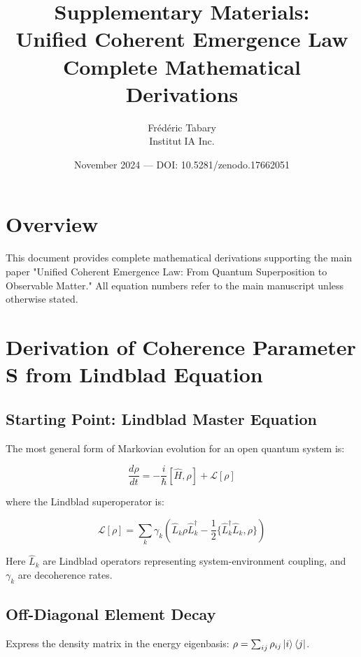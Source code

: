 \documentclass[12pt,a4paper]{article}
\title{\textbf{Supplementary Materials:}\\
\textbf{Unified Coherent Emergence Law}\\
\large Complete Mathematical Derivations}
\author{Frédéric Tabary \\ Institut🦋IA Inc.}
\date{November 2024 --- DOI: 10.5281/zenodo.17662051}
\begin{document}
\maketitle

\section*{Overview}

This document provides complete mathematical derivations supporting the main paper "Unified Coherent Emergence Law: From Quantum Superposition to Observable Matter." All equation numbers refer to the main manuscript unless otherwise stated.

\tableofcontents
\clearpage

\section{Derivation of Coherence Parameter S from Lindblad Equation}

\subsection{Starting Point: Lindblad Master Equation}

The most general form of Markovian evolution for an open quantum system is:

\begin{equation}
\frac{d\rho}{dt} = -\frac{i}{\hbar}[\hat{H}, \rho] + \mathcal{L}[\rho]
\tag{S1}
\end{equation}

where the Lindblad superoperator is:

\begin{equation}
\mathcal{L}[\rho] = \sum_k \gamma_k \left( \hat{L}_k \rho \hat{L}_k^\dagger - \frac{1}{2}\{\hat{L}_k^\dagger \hat{L}_k, \rho\} \right)
\tag{S2}
\end{equation}

Here $\hat{L}_k$ are Lindblad operators representing system-environment coupling, and $\gamma_k$ are decoherence rates.

\subsection{Off-Diagonal Element Decay}

Express the density matrix in the energy eigenbasis: $\rho = \sum_{ij} \rho_{ij} \ket{i}\bra{j}$.
\end{document}
